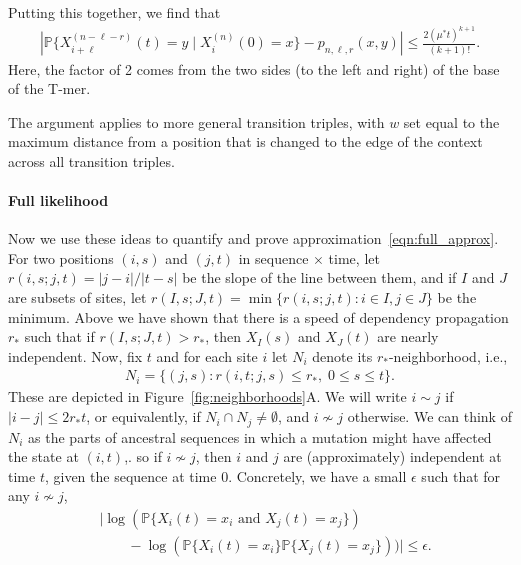 \documentclass{article}
\renewcommand{\P}{\mathbb{P}}
\theoremstyle{plain}
\theoremstyle{definition}
\begin{document}
Putting this together,
we find that
\begin{align*}
    \left|
        \P\{ X_{i+\ell}^{(n-\ell-r)}(t) = y \mid X_i^{(n)}(0) = x \}
        -
        p_{n,\ell,r}(x,y)
    \right|
    \le
    \frac{
        2 (\mu^* t)^{k+1}
    }{
        (k+1)!
    } .
\end{align*}
Here, the factor of 2 comes from the two sides (to the left and right) of the base of the T-mer.

The argument applies to more general transition triples,
with $w$ set equal to the maximum distance
from a position that is changed to the edge of the context
across all transition triples.


\paragraph{Full likelihood}
Now we use these ideas to quantify and prove approximation~\eqref{eqn:full_approx}.
For two positions $(i,s)$ and $(j,t)$ in sequence $\times$ time,
let $r(i,s;j,t) = |j-i|/|t-s|$ be the slope of the line between them,
and if $I$ and $J$ are subsets of sites, let $r(I,s;J,t) = \min\{r(i,s;j,t) : i\in I, j \in J\}$
be the minimum.
Above we have shown that there is a speed of dependency propagation $r_*$
such that if $r(I,s;J,t) > r_*$,
then $X_I(s)$ and $X_J(t)$ are nearly independent.
Now, fix $t$ and for each site $i$ let $N_i$ denote its $r_*$-neighborhood,
i.e.,
\begin{align}
    N_i = \{ (j,s) : r(i,t; j,s) \le r_*, \; 0 \le s \le t \} .
\end{align}
These are depicted in Figure~\ref{fig:neighborhoods}A.
We will write $i \sim j$ if $|i-j| \le 2 r_* t$,
or equivalently, if $N_i \cap N_j \neq \emptyset$,
and $i \nsim j$ otherwise.
We can think of $N_i$ as the parts of ancestral sequences in which a mutation might have affected the state at $(i,t)$,.
so if $i \nsim j$, then $i$ and $j$ are (approximately) independent at time $t$, given the sequence at time 0.
Concretely,
we have a small $\epsilon$ such that for any $i \nsim j$,
\begin{align*}
    &\big|
    \log( \P\{ X_i(t) = x_i \text{ and } X_j(t) = x_j \} ) \\
    &\qquad {} -
    \log( \P\{ X_i(t) = x_i \} \P\{ X_j(t) = x_j \} )
    ) \big|
    \le \epsilon .
\end{align*}
\end{document}
